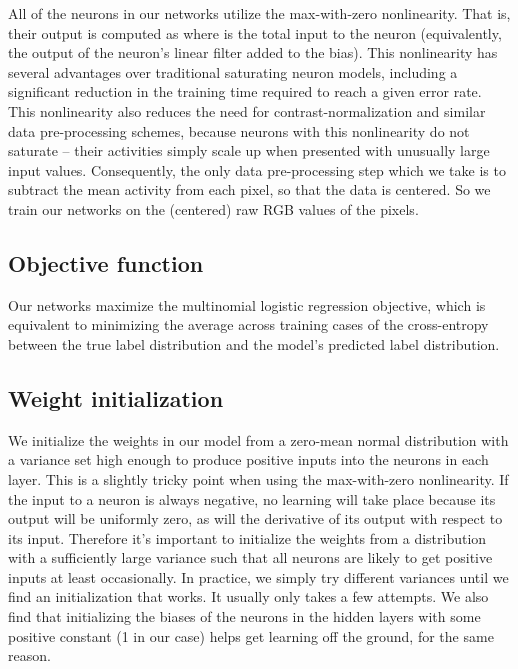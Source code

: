\documentclass[12pt]{article}
\begin{document}
All of the neurons in our networks utilize the max-with-zero nonlinearity.
That is, their output is computed as 
where  is the total input to the neuron (equivalently,
the output of the neuron's linear filter added to the bias). This nonlinearity has several
advantages over traditional saturating neuron models, including a
significant reduction in the training time required to reach a given
error rate. This nonlinearity also reduces the need for contrast-normalization
and similar data pre-processing schemes, because neurons with this
nonlinearity do not saturate -- their activities simply scale up when
presented with unusually large input values. Consequently, the only
data pre-processing step which we take is to subtract the mean activity
from each pixel, so that the data is centered. So we train our networks
on the (centered) raw RGB values of the pixels.


\subsection{Objective function}

Our networks maximize the multinomial logistic regression objective,
which is equivalent to minimizing the average across training cases
of the cross-entropy between the true label distribution and the model's
predicted label distribution.


\subsection{Weight initialization}

We initialize the weights in our model from a zero-mean normal distribution
with a variance set high enough to produce positive inputs into the
neurons in each layer. This is a slightly tricky point when using
the max-with-zero nonlinearity. If the input to a neuron is always
negative, no learning will take place because its output will be uniformly
zero, as will the derivative of its output with respect to its input.
Therefore it's important to initialize the weights from a distribution
with a sufficiently large variance such that all neurons are likely
to get positive inputs at least occasionally. In practice, we simply
try different variances until we find an initialization that works.
It usually only takes a few attempts. We also find that initializing
the biases of the neurons in the hidden layers with some positive
constant (1 in our case) helps get learning off the ground, for the
same reason.
\end{document}
